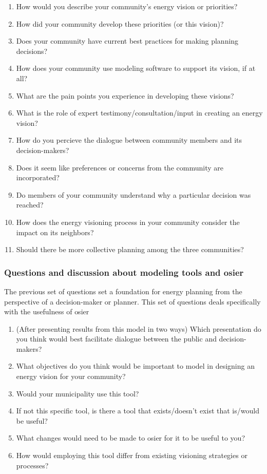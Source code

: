 \begin{enumerate}
    \item How would you describe your community's energy vision or priorities?
    \item How did your community develop these priorities (or this vision)?
    \item Does your community have current best practices for making planning
    decisions?
    \item How does your community use modeling software to support its vision,
    if at all?
    \item What are the pain points you experience in developing these visions?
    \item What is the role of expert testimony/consultation/input in creating an
    energy vision?
    \item How do you percieve the dialogue between community members and its
    decision-makers?
    \item Does it seem like preferences or concerns from the community are
    incorporated? 
    \item Do members of your community understand why a particular decision was
    reached?
    \item How does the energy visioning process in your community consider the
    impact on its neighbors?
    \item Should there be more collective planning among the three communities?
\end{enumerate}

\subsubsection{Questions and discussion about modeling tools and \ac{osier}} The
previous set of questions set a foundation for energy planning from the
perspective of a decision-maker or planner. This set of questions deals
specifically with the usefulness of \ac{osier} 

\begin{enumerate}
    \item (After presenting results from this model in two ways) Which
    presentation do you think would best facilitate dialogue between the
    public and decision-makers?
    \item What objectives do you think would be important to model in designing
    an energy vision for your community?
    \item Would your municipality use this tool? 
    \item If not this specific tool, is there a tool that exists/doesn't exist
    that is/would be useful?
    \item What changes would need to be made to \ac{osier} for it to be useful
    to you?
    \item How would employing this tool differ from existing visioning
    strategies or processes?
\end{enumerate}


